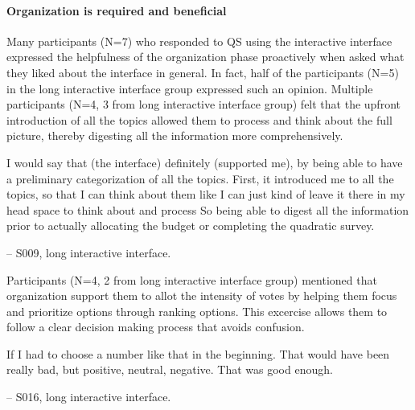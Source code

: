 \paragraph{Organization is required and beneficial}
Many participants (N=7) who responded to QS using the interactive interface expressed the helpfulness of the organization phase proactively when asked what they liked about the interface in general. In fact, half of the participants (N=5) in the long interactive interface group expressed such an opinion. Multiple participants (N=4, 3 from long interactive interface group) felt that the upfront introduction of all the topics allowed them to process and think about the full picture, thereby digesting all the information more comprehensively. 

\begin{displayquote}
I would say that (the interface) definitely (supported me), by being able to have a preliminary categorization of all the topics. First, it introduced me to all the topics, so that I can think about them like I can just kind of leave it there in my head space to think about and process \bracketellipsis So being able to digest all the information prior to actually allocating the budget or completing the quadratic survey.

\noindent \hfill -- S009, long interactive interface.
\end{displayquote}



Participants (N=4, 2 from long interactive interface group) mentioned that organization support them to allot the intensity of votes by helping them focus and prioritize options through ranking options. This excercise allows them to follow a clear decision making process that avoids confusion.

\begin{displayquote}
If I had to choose a number like that in the beginning. That would have been really bad, but positive, neutral, negative. That was good enough.

\noindent \hfill -- S016, long interactive interface.
\end{displayquote}

